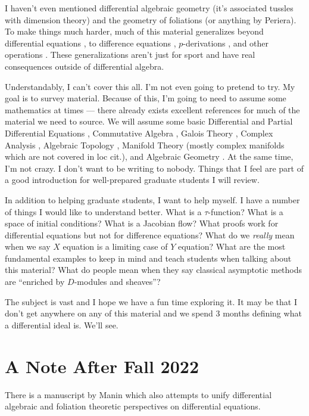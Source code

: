 \documentclass[12pt]{book}
\numberwithin{equation}{section}
\theoremstyle{definition}
\theoremstyle{remark}
\begin{document}
I haven't even mentioned differential algebraic geometry (it's associated tussles with dimension theory) and the geometry of foliations \cite{Bryant1991} (or anything by Periera). To make things much harder, much of this material generalizes beyond differential equations , to difference equations \cite{Hrushovski2004}, $p$-derivations \cite{Buium2005}, and other operations \cite{Borger2005}.
These generalizations aren't just for sport and have real consequences outside of differential algebra.

Understandably, I can't cover this all. 
I'm not even going to pretend to try. 
My goal is to survey material.
Because of this, I'm going to need to assume some mathematics at times --- there already exists excellent references for much of the material we need to source.  
We will assume some basic Differential \cite{Ince1944} and Partial Differential Equations \cite{Evans2010}, Commutative Algebra \cite{Atiyah2016}, Galois Theory \cite{Cox2012}, Complex Analysis \cite{Ullrich2008}, Algebraic Topology \cite{Hatcher2002}, Manifold Theory \cite{Lee2013} (mostly complex manifolds which are not covered in loc cit.), and Algebraic Geometry \cite{Vakil2017}. 
At the same time, I'm not crazy. 
I don't want to be writing to nobody. 
Things that I feel are part of a good introduction for well-prepared graduate students I will review. 

In addition to helping graduate students, I want to help  myself.
I have a number of things I would like to understand better. What is a $\tau$-function? What is a space of initial conditions? 
What is a Jacobian flow? What proofs work for differential equations but not for difference equations? 
What do we \emph{really} mean when we say $X$ equation is a limiting case of $Y$ equation?
What are the most fundamental examples to keep in mind and teach students when talking about this material?
What do people mean when they say classical asymptotic methods are ``enriched by $D$-modules and sheaves''?

The subject is vast and I hope we have a fun time exploring it. 
It may be that I don't get anywhere on any of this material and we spend 3 months defining what a differential ideal is. 
We'll see. 

\iffalse
\section*{A Note After Fall 2022} 
There is a manuscript by Manin \cite{Manin1978} which also attempts to unify differential algebraic and foliation theoretic perspectives on differential equations.
\end{document}
